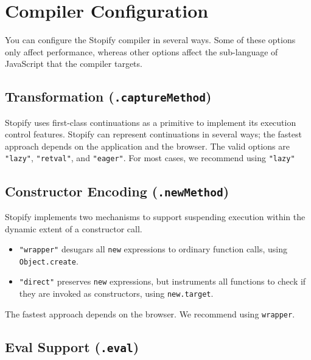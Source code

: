 \documentclass[10pt]{book}
\begin{document}
\section{Compiler Configuration}

\lstset{language=js}

You can configure the Stopify compiler in several ways. Some of these
options only affect performance, whereas other options affect the
sub-language of JavaScript that the compiler targets.

\subsection{Transformation (\texttt{.captureMethod})\label{transformation}}

Stopify uses first-class continuations as a primitive to implement its
execution control features. Stopify can represent continuations in several
ways; the fastest approach depends on the application and the browser. The
valid options are \lstinline|"lazy"|, \lstinline|"retval"|, and
\lstinline|"eager"|. For most cases, we recommend using \lstinline|"lazy"|

\subsection{Constructor Encoding (\texttt{.newMethod})\label{new-method}}

Stopify implements two mechanisms to support suspending execution within the
dynamic extent of a constructor call.

\begin{itemize}

\item \lstinline|"wrapper"| desugars all \lstinline|new| expressions to ordinary
function calls, using \lstinline|Object.create|.

\item \lstinline|"direct"| preserves \lstinline|new| expressions,
 but instruments all functions to check if they are invoked as constructors,
 using \lstinline|new.target|.

\end{itemize}

The fastest approach depends on the browser.
We recommend using \lstinline|wrapper|.

\subsection{Eval Support (\texttt{.eval})\label{eval-flag}}
\end{document}
